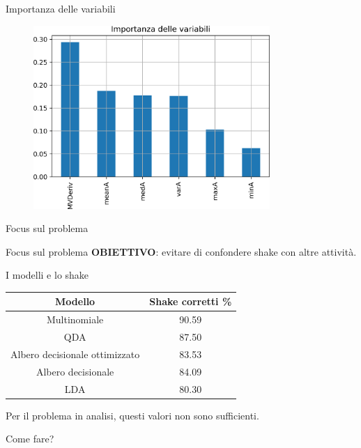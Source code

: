 \documentclass{beamer}
\newcommand{\separator}[1]{
\begin{frame}[sep]
\centering
\vspace*{\fill}
{\color{white}\huge #1}
\vspace*{\fill}
\end{frame}
}
\begin{document}
\begin{frame}{Importanza delle variabili}
\begin{figure}[H]
\includegraphics[width=0.8\textwidth]{../figure/importance-Tree.png}
\end{figure}
\end{frame}

\separator{Focus sul problema}

\begin{frame}{Focus sul problema}
\textbf{OBIETTIVO}: evitare di confondere shake con altre attività.

\end{frame}

\begin{frame}{I modelli e lo shake}
\begin{table}[H]
\begin{tabular}{cc}
\toprule
Modello & Shake corretti \% \\
\midrule
Multinomiale & 90.59\\
QDA & 87.50\\
Albero decisionale ottimizzato & 83.53\\
Albero decisionale & 84.09\\
LDA & 80.30\\
\bottomrule
\end{tabular}
\end{table}

Per il problema in analisi, questi valori non sono sufficienti. 

Come fare?
\end{frame}
\end{document}

